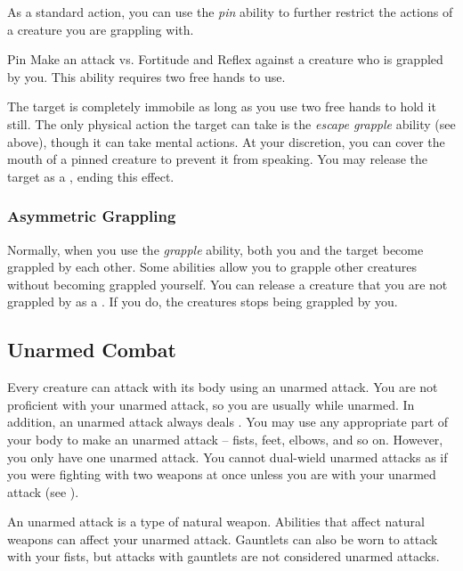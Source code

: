             \label{Pin} As a standard action, you can use the \textit{pin} ability to further restrict the actions of a creature you are grappling with.

            \begin{freeability}{Pin}
                Make an attack vs. Fortitude and Reflex against a creature who is grappled by you.
                This ability requires two free hands to use.

                \hit The target is completely immobile as long as you use two free hands to hold it still.
                The only physical action the target can take is the \textit{escape grapple} ability (see above), though it can take mental actions.
                At your discretion, you can cover the mouth of a pinned creature to prevent it from speaking.
                You may release the target as a , ending this effect.
            \end{freeability}

        \subsubsection{Asymmetric Grappling}\label{Asymmetric Grappling}
            Normally, when you use the \textit{grapple} ability, both you and the target become grappled by each other.
            Some abilities allow you to grapple other creatures without becoming grappled yourself.
            You can release a creature that you are not grappled by as a .
            If you do, the creatures stops being grappled by you.

    \subsection{Unarmed Combat}\label{Unarmed Combat}
        Every creature can attack with its body using an unarmed attack.
        You are not proficient with your unarmed attack, so you are usually  while unarmed.
        In addition, an unarmed attack always deals .
        You may use any appropriate part of your body to make an unarmed attack -- fists, feet, elbows, and so on.
        However, you only have one unarmed attack.
        You cannot dual-wield unarmed attacks as if you were fighting with two weapons at once unless you are  with your unarmed attack (see ).

        An unarmed attack is a type of natural weapon.
        Abilities that affect natural weapons can affect your unarmed attack.
        Gauntlets can also be worn to attack with your fists, but attacks with gauntlets are not considered unarmed attacks.

